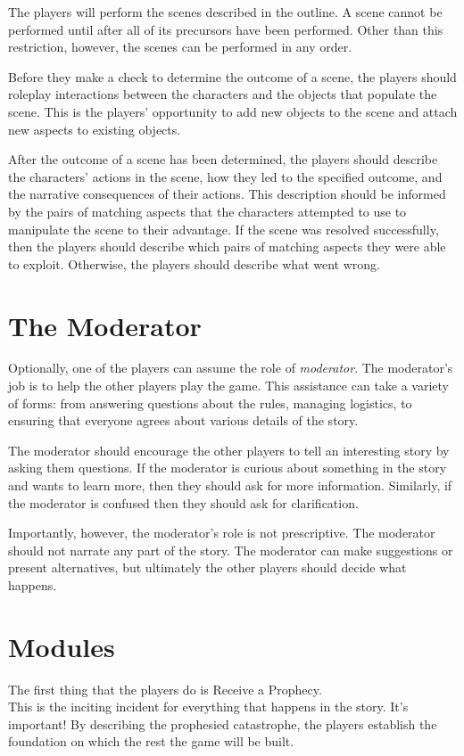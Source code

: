 \documentclass[12pt, a5paper, parskip=half-]{scrartcl}
\begin{document}
The players will perform the scenes described in the outline.
A scene cannot be performed until after all of its precursors have been performed. Other than this restriction, however, the scenes can be performed in any order.

Before they make a check to determine the outcome of a scene, the players should roleplay interactions between the characters and the objects that populate the scene.
This is the players' opportunity to add new objects to the scene and attach new aspects to existing objects.

After the outcome of a scene has been determined, the players should describe the characters' actions in the scene, how they led to the specified outcome, and the narrative consequences of their actions.
This description should be informed by the pairs of matching aspects that the characters attempted to use to manipulate the scene to their advantage.
If the scene was resolved successfully, then the players should describe which pairs of matching aspects they were able to exploit.
Otherwise, the players should describe what went wrong.

\newpage

\section*{The Moderator}
Optionally, one of the players can assume the role of \emph{moderator}. The moderator's job is to help the other players play the game. This assistance can take a variety of forms: from answering questions about the rules, managing logistics,  to ensuring that everyone agrees about various details of the story.

The moderator should encourage the other players to tell an interesting story by asking them questions.  If the moderator is curious about something in the story and wants to learn more,  then they should ask for more information.  Similarly, if the moderator is confused then they should ask for clarification.

Importantly, however, the moderator's role is not prescriptive.  The moderator should not narrate any part of the story. The moderator can make suggestions or present alternatives, but ultimately the other players should decide what happens.

\newpage

\section*{Modules}
The first thing that the players do is {\cinzel \small Receive a Prophecy}.  \\
This is the inciting incident for everything that happens in the story.
It's important!
By describing the prophesied catastrophe, the players establish the foundation on which the rest the game will be built.
\end{document}
